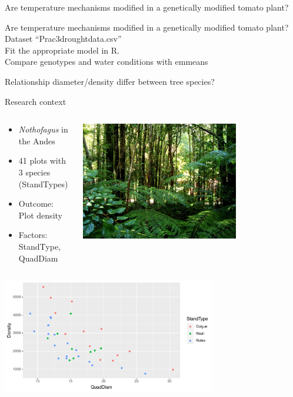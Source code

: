 \documentclass[10pt]{beamer}
\begin{document}
\begin{frame}{Are temperature mechanisms modified in a genetically modified tomato plant?}
\end{frame}

\begin{frame}{Are temperature mechanisms modified in a genetically modified tomato plant?}
 Dataset ``Prac3droughtdata.csv''\\
 Fit the appropriate model in R.\\
 Compare genotypes and water conditions with emmeans
 
\end{frame}

\begin{frame}{Relationship diameter/density differ between tree species?}
 
  \begin{block}{Research context}
 \begin{columns}
  \begin{column}{0.6\textwidth}
   \begin{itemize}
    \item \textit{Nothofagus} in the Andes
    \item 41 plots with 3 species (StandTypes)
    \item Outcome: Plot density
    \item Factors: StandType, QuadDiam
   \end{itemize}
  \end{column}
  \begin{column}{0.4\textwidth}
    \includegraphics[width=0.7\textwidth]{Figures/forest}
  \end{column}

 \end{columns}
 \end{block}
 
 \pause
 \includegraphics[width=0.7\textwidth]{Figures/trees}
 
\end{frame}
\end{document}
